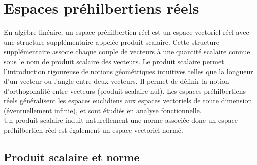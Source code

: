 \documentclass{book}
\begin{document}
\chapter*{Espaces préhilbertiens réels}

En algèbre linéaire, un espace préhilbertien réel est un espace vectoriel réel avec une structure supplémentaire appelée produit scalaire. Cette structure supplémentaire associe chaque couple de vecteurs à une quantité scalaire connue sous le nom de produit scalaire des vecteurs. Le produit scalaire permet l'introduction rigoureuse de notions géométriques intuitives telles que la longueur d'un vecteur ou l'angle entre deux vecteurs. Il permet de définir la notion d'orthogonalité entre vecteurs (produit scalaire nul). Les espaces préhilbertiens réels généralisent les espaces euclidiens aux espaces vectoriels de toute dimension (éventuellement infinie), et sont étudiés en analyse fonctionnelle.\\
Un produit scalaire induit naturellement une norme associée  donc un espace préhilbertien réel est également un espace vectoriel normé.

\section{Produit scalaire et norme}
\end{document}
